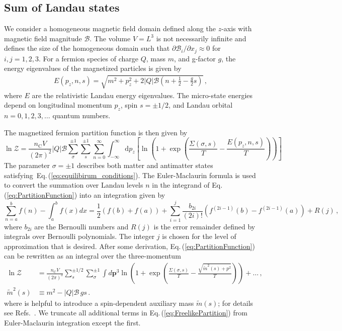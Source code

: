 \documentclass[epjST]{svjour}
\newcommand{\req}[1]{Eq.\,(\ref{#1})}
\begin{document}
\subsection{Sum of Landau states}
\label{sec:Landau}
We consider a homogeneous magnetic field domain defined along the $z$-axis with magnetic field magnitude $\mathcal{B}$. The volume $V=L^{3}$ is not necessarily infinite and defines the size of the homogeneous domain such that $\partial\mathcal{B}_{i}/\partial x_{j}\approx0$ for \(i,j=1,2,3\). For a fermion species of charge $Q$, mass $m$, and g-factor $g$, the energy eigenvalues of the magnetized particles is given by~\cite{Steinmetz:2018ryf}
\begin{align}
\label{eq:energystates}
E(p_{z},n,s)=\sqrt{m^{2}+p_{z}^{2}+2|Q|\mathcal{B}\left(n+\frac{1}{2}-\frac{g}{2}s\right)}\,,
\end{align}
where $E$ are the relativistic Landau energy eigenvalues. The micro-state energies depend on longitudinal momentum \(p_{z}\), spin $s=\pm1/2$, and Landau orbital $n=0,1,2,3,\ldots$ quantum numbers. 

{\color{blue} The magnetized fermion partition function is then given by
\begin{equation}
\label{eq:PartitionFunction}
\ln\mathcal{Z}=\frac{n_{\mathrm{C}}V}{(2\pi)^{2}}|Q|\mathcal{B}\sum_{\sigma}^{\pm1}\sum_{s}^{\pm1}\sum_{n=0}^{\infty}\int_{-\infty}^{\infty}\mathrm{d}p_{z}\left[\ln\left(1+\exp\left(\frac{\Sigma(\sigma,s)}{T}-\frac{E(p_{z},n,s)}{T}\right)\right)\right]\,
\end{equation}
}The parameter \(\sigma=\pm1\) describes both matter and antimatter states satisfying~\req{eq:equilibirum_conditions}. {\color{blue}The Euler-Maclaurin formula is used to convert the summation over Landau levels $n$ in the integrand of \req{eq:PartitionFunction} into an integration given by
\begin{equation}
\label{eq:EulerMaclaurin}\sum^{b}_{n=a}f(n)-\int^{b}_{a}f(x)dx = \frac{1}{2}\left(f(b)+f(a)\right)
+\sum_{i=1}^{j}\frac{b_{2i}}{(2i)!}\left(f^{(2i-1)}(b)-f^{(2i-1)}(a)\right)+R(j)\,,
\end{equation}
where $b_{2i}$ are the Bernoulli numbers and $R(j)$ is the error remainder defined by integrals over Bernoulli polynomials. The integer $j$ is chosen for the level of approximation that is desired. After some derivation, \req{eq:PartitionFunction} can be rewritten as an integral over the three-momentum
\begin{align}
\label{eq:FreelikePartition}
\ln\mathcal{Z} &= \frac{n_\mathrm{C}V}{(2\pi)^{3}}\sum_{s}^{\pm1/2}\sum_{\sigma}^{\pm1}\int d\mathbf{p}^{3}\ln\left(1+\exp{\left(\frac{\Sigma(\sigma,s)}{T}-\frac{\sqrt{\tilde{m}^2(s)+p^{2}}}{T}\right)}\right)+\ldots\,,\\
\label{eq:spinmass}
\tilde{m}^{2}(s) &\equiv m^{2} - |Q|\mathcal{B}\,g s\,.
\end{align}
where} is helpful to introduce a spin-dependent auxiliary mass \(\tilde{m}(s)\); {\color{blue}for details see Refs.~\cite{Steinmetz:2023nsc,Steinmetz:2023ucp}. We truncate all additional terms in \req{eq:FreelikePartition} from Euler-Maclaurin integration except the first.} 
\end{document}
